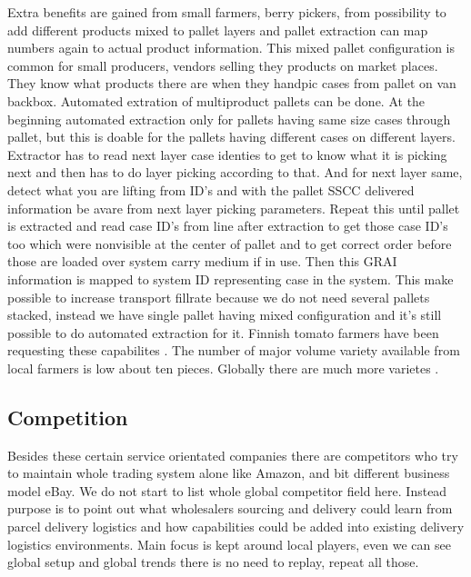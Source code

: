 Extra benefits are gained from small farmers, berry pickers, from possibility
to add different products mixed to pallet layers and pallet extraction can map
numbers again to actual product information. This mixed pallet configuration
is common for small producers, vendors selling they products on market places.
They know what products there are when they handpic cases from pallet on van
backbox. Automated extration of multiproduct pallets can be done. At the
beginning automated extraction only for pallets having same size cases
through pallet, but this is doable for the pallets having different cases on
different layers. Extractor has to read next layer case identies to get to
know what it is picking next and then has to do layer picking according
to that. And for next layer same, detect what you are lifting from ID's and
with the pallet SSCC delivered information be avare from next layer picking
parameters. Repeat this until pallet is extracted and read case ID's from line
after extraction to get those case ID's too which were nonvisible at the center
of pallet and to get correct order before those are loaded over system carry
medium if in use. Then this GRAI information is mapped to system ID
representing case in the system. This make possible to increase transport
fillrate because we do not need several pallets stacked, instead we have single
pallet having mixed configuration and it's still possible to do automated
extraction for it. Finnish tomato farmers have been requesting these
capabilites \cite{WaterBalls}. The number of major volume variety available
from local farmers is low about ten pieces. Globally there are much more
varietes \cite{PlantVariety}.

\subsection{Competition}
\label{competition}
Besides these certain service orientated companies there are competitors who
try to maintain whole trading system alone like Amazon\cite{Amazon}, and bit
different business model eBay\cite{eBay}. We do not start to list whole global
competitor field here. Instead purpose is to point out what wholesalers
sourcing and delivery could learn from parcel delivery logistics and how
capabilities could be added into existing delivery logistics environments.
Main focus is kept around local players, even we can see global setup and
global trends there is no need to replay, repeat all those.

